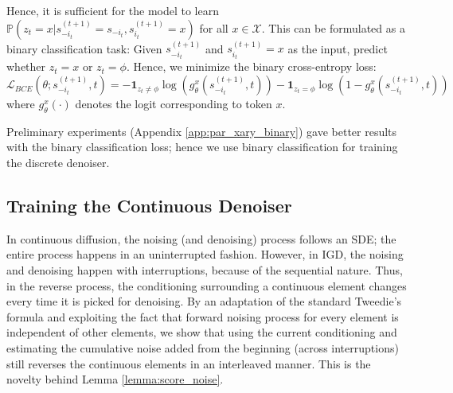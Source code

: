 Hence, it is sufficient for the model to learn $\mathbb{P}\left({z_t} = x | {s}^{(t+1)}_{-i_t} = {s}_{-i_t}, {s}^{(t+1)}_{i_t} = x \right)$ for all $x \in \mathcal{X}$. This can be formulated as a binary classification task: Given ${s}^{(t+1)}_{-i_t}$ and ${s}^{(t+1)}_{i_t} = x$ as the input, predict whether $z_t = x$ or $z_t = \phi$. Hence, we minimize the binary cross-entropy loss: $
    \mathcal{L}_{BCE}\left(\theta; {s}^{(t+1)}_{-i_t}, t \right) = -  \mathbf{1}_{z_t \neq \phi}  \log \left( g_{\theta} ^{x} \left({s}^{(t+1)}_{-i_t}, t \right) \right) 
    - \mathbf{1}_{z_t = \phi}  \log \left(1 - g_{\theta} ^{x} \left({s}^{(t+1)}_{-i_t}, t \right) \right)  $
\normalsize
where $g^{x}_{\theta}(\cdot) $ denotes the logit corresponding to token $x$.

Preliminary experiments (Appendix \ref{app:par_xary_binary}) gave better results with the binary classification loss; hence we use binary classification for training the discrete denoiser.


\subsection{Training the Continuous Denoiser}
\label{subsec:con_den}

In continuous diffusion, the noising (and denoising) process follows an SDE; the entire process happens in an uninterrupted fashion. However, in IGD, the noising and denoising happen with interruptions, because of the sequential nature. Thus, in the reverse process, the conditioning surrounding a continuous element changes every time it is picked for denoising. By an adaptation of the standard Tweedie's formula and exploiting the fact that forward noising process for every element is independent of other elements, we show that using the current conditioning and estimating the cumulative noise added from the beginning (across interruptions) still reverses the continuous elements in an interleaved manner. This is the novelty behind Lemma \ref{lemma:score_noise}.


